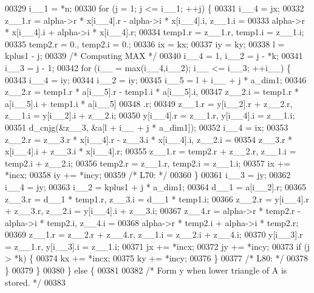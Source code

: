 \begin{DoxyCode}
00329         i\_\_1 = *n;
00330         \textcolor{keywordflow}{for} (j = 1; j <= i\_\_1; ++j) \{
00331         i\_\_4 = jx;
00332         z\_\_1.r = alpha->r * x[i\_\_4].r - alpha->i * x[i\_\_4].i, z\_\_1.i =
00333              alpha->r * x[i\_\_4].i + alpha->i * x[i\_\_4].r;
00334         temp1.r = z\_\_1.r, temp1.i = z\_\_1.i;
00335         temp2.r = 0., temp2.i = 0.;
00336         ix = kx;
00337         iy = ky;
00338         l = kplus1 - j;
00339 \textcolor{comment}{/* Computing MAX */}
00340         i\_\_4 = 1, i\_\_2 = j - *k;
00341         i\_\_3 = j - 1;
00342         \textcolor{keywordflow}{for} (i\_\_ = max(i\_\_4,i\_\_2); i\_\_ <= i\_\_3; ++i\_\_) \{
00343             i\_\_4 = iy;
00344             i\_\_2 = iy;
00345             i\_\_5 = l + i\_\_ + j * a\_dim1;
00346             z\_\_2.r = temp1.r * a[i\_\_5].r - temp1.i * a[i\_\_5].i, 
00347                 z\_\_2.i = temp1.r * a[i\_\_5].i + temp1.i * a[i\_\_5]
00348                 .r;
00349             z\_\_1.r = y[i\_\_2].r + z\_\_2.r, z\_\_1.i = y[i\_\_2].i + z\_\_2.i;
00350             y[i\_\_4].r = z\_\_1.r, y[i\_\_4].i = z\_\_1.i;
00351             d\_cnjg(&z\_\_3, &a[l + i\_\_ + j * a\_dim1]);
00352             i\_\_4 = ix;
00353             z\_\_2.r = z\_\_3.r * x[i\_\_4].r - z\_\_3.i * x[i\_\_4].i, z\_\_2.i =
00354                  z\_\_3.r * x[i\_\_4].i + z\_\_3.i * x[i\_\_4].r;
00355             z\_\_1.r = temp2.r + z\_\_2.r, z\_\_1.i = temp2.i + z\_\_2.i;
00356             temp2.r = z\_\_1.r, temp2.i = z\_\_1.i;
00357             ix += *incx;
00358             iy += *incy;
00359 \textcolor{comment}{/* L70: */}
00360         \}
00361         i\_\_3 = jy;
00362         i\_\_4 = jy;
00363         i\_\_2 = kplus1 + j * a\_dim1;
00364         d\_\_1 = a[i\_\_2].r;
00365         z\_\_3.r = d\_\_1 * temp1.r, z\_\_3.i = d\_\_1 * temp1.i;
00366         z\_\_2.r = y[i\_\_4].r + z\_\_3.r, z\_\_2.i = y[i\_\_4].i + z\_\_3.i;
00367         z\_\_4.r = alpha->r * temp2.r - alpha->i * temp2.i, z\_\_4.i = 
00368             alpha->r * temp2.i + alpha->i * temp2.r;
00369         z\_\_1.r = z\_\_2.r + z\_\_4.r, z\_\_1.i = z\_\_2.i + z\_\_4.i;
00370         y[i\_\_3].r = z\_\_1.r, y[i\_\_3].i = z\_\_1.i;
00371         jx += *incx;
00372         jy += *incy;
00373         \textcolor{keywordflow}{if} (j > *k) \{
00374             kx += *incx;
00375             ky += *incy;
00376         \}
00377 \textcolor{comment}{/* L80: */}
00378         \}
00379     \}
00380     \} \textcolor{keywordflow}{else} \{
00381 
00382 \textcolor{comment}{/*        Form  y  when lower triangle of A is stored. */}
00383 

\end{DoxyCode}
